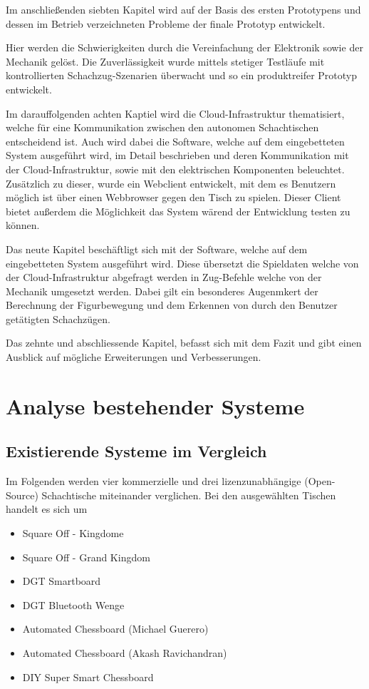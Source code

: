 Im anschließenden siebten Kapitel wird auf der Basis des ersten
Prototypens und dessen im Betrieb verzeichneten Probleme der finale
Prototyp entwickelt.

Hier werden die Schwierigkeiten durch die Vereinfachung der Elektronik
sowie der Mechanik gelöst. Die Zuverlässigkeit wurde mittels stetiger
Testläufe mit kontrollierten Schachzug-Szenarien überwacht und so ein
produktreifer Prototyp entwickelt.

Im darauffolgenden achten Kaptiel wird die Cloud-Infrastruktur
thematisiert, welche für eine Kommunikation zwischen den autonomen
Schachtischen entscheidend ist. Auch wird dabei die Software, welche auf
dem eingebetteten System ausgeführt wird, im Detail beschrieben und
deren Kommunikation mit der Cloud-Infrastruktur, sowie mit den
elektrischen Komponenten beleuchtet. Zusätzlich zu dieser, wurde ein
Webclient entwickelt, mit dem es Benutzern möglich ist über einen
Webbrowser gegen den Tisch zu spielen. Dieser Client bietet außerdem die
Möglichkeit das System wärend der Entwicklung testen zu können.

Das neute Kapitel beschäftligt sich mit der Software, welche auf dem
eingebetteten System ausgeführt wird. Diese übersetzt die Spieldaten
welche von der Cloud-Infrastruktur abgefragt werden in Zug-Befehle
welche von der Mechanik umgesetzt werden. Dabei gilt ein besonderes
Augenmkert der Berechnung der Figurbewegung und dem Erkennen von durch
den Benutzer getätigten Schachzügen.

Das zehnte und abschliessende Kapitel, befasst sich mit dem Fazit und
gibt einen Ausblick auf mögliche Erweiterungen und Verbesserungen.

\hypertarget{analyse-bestehender-systeme}{%
\chapter{Analyse bestehender
Systeme}\label{analyse-bestehender-systeme}}

\hypertarget{existierende-systeme-im-vergleich}{%
\section{Existierende Systeme im
Vergleich}\label{existierende-systeme-im-vergleich}}

Im Folgenden werden vier kommerzielle und drei lizenzunabhängige
(Open-Source) Schachtische miteinander verglichen. Bei den ausgewählten
Tischen handelt es sich um

\begin{itemize}
\tightlist
\item
  Square Off - Kingdome
\item
  Square Off - Grand Kingdom
\item
  DGT Smartboard
\item
  DGT Bluetooth Wenge
\item
  Automated Chessboard (Michael Guerero)
\item
  Automated Chessboard (Akash Ravichandran)
\item
  DIY Super Smart Chessboard
\end{itemize}

